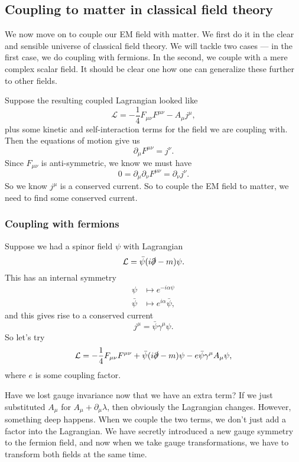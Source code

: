 \documentclass[a4paper]{article}
\begin{document}
\subsection{Coupling to matter in classical field theory}
We now move on to couple our EM field with matter. We first do it in the clear and sensible universe of classical field theory. We will tackle two cases --- in the first case, we do coupling with fermions. In the second, we couple with a mere complex scalar field. It should be clear one how one can generalize these further to other fields.

Suppose the resulting coupled Lagrangian looked like
\[
  \mathcal{L} = - \frac{1}{4} F_{\mu\nu}F^{\mu\nu} - A_\mu j^\mu,
\]
plus some kinetic and self-interaction terms for the field we are coupling with. Then the equations of motion give us
\[
  \partial_\mu F^{\mu\nu} = j^\nu.
\]
Since $F_{\mu\nu}$ is anti-symmetric, we know we must have
\[
  0 = \partial_\mu \partial_\nu F^{\mu\nu} = \partial_\nu j^\nu.
\]
So we know $j^\mu$ is a conserved current. So to couple the EM field to matter, we need to find some conserved current.

\subsubsection*{Coupling with fermions}
Suppose we had a spinor field $\psi$ with Lagrangian
\[
  \mathcal{L} = \bar\psi (i \slashed\partial -m ) \psi.
\]
This has an internal symmetry
\begin{align*}
  \psi &\mapsto e^{-i\alpha \psi}\\
  \bar\psi &\mapsto e^{i \alpha} \bar\psi,
\end{align*}
and this gives rise to a conserved current
\[
  j^\mu = \bar\psi \gamma^\mu \psi.
\]
So let's try
\[
  \mathcal{L} = -\frac{1}{4}F_{\mu\nu}F^{\mu\nu} + \bar\psi(i \slashed \partial- m)\psi - e \bar\psi \gamma^\mu A_\mu \psi,
\]
where $e$ is some coupling factor.

Have we lost gauge invariance now that we have an extra term? If we just substituted $A_\mu$ for $A_\mu + \partial_\mu \lambda$, then obviously the Lagrangian changes. However, something deep happens. When we couple the two terms, we don't just add a factor into the Lagrangian. We have secretly introduced a new gauge symmetry to the fermion field, and now when we take gauge transformations, we have to transform both fields at the same time.
\end{document}
